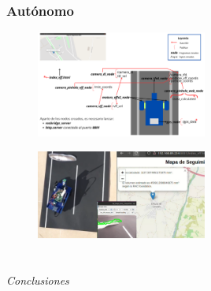 \documentclass{beamer}
\begin{document}
\begin{frame}
	\frametitle{Autónomo}
	
	\begin{figure}
		\centering
		\includegraphics[width=0.5\textwidth]{figs/esquema_nodos_vff_ampliado.png} %
	\end{figure}
	
	\vspace{0.15cm} %
	
	\begin{figure}
		\centering
		\includegraphics[width=0.5\textwidth]{figs/autonomo_final.png} %
	\end{figure}
\end{frame}


\section*{}
\begin{frame}{}
  \centering \Huge
  \emph{Conclusiones}
\end{frame}
\end{document}
